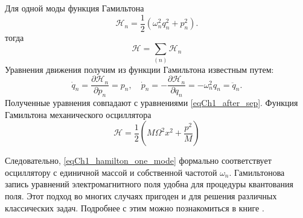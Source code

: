 Для одной моды функция Гамильтона  
\begin{equation}
\mathcal{H}_n = \frac{1}{2}\left(\omega_n^2 q_n^2 + p_n^2\right).
\label{eqCh1_hamilton_one_mode}
\end{equation}
тогда
\begin{equation}
\mathcal{H} = \sum_{(n)} \mathcal{H}_n
\label{eqCh1_hamilton_sum_mode}
\end{equation}
Уравнения движения получим из функции Гамильтона известным путем:
\begin{equation}
\dot{q}_n = \frac{\partial \mathcal{H}_n}{\partial p_n} = p_n,
\quad
\dot{p}_n = - \frac{\partial \mathcal{H}_n}{\partial q_n} =
- \omega_n^2 q_n = \ddot{q}_n.
\end{equation}
Полученные уравнения совпадают с уравнениями \eqref{eqCh1_after_sep}.  
Функция Гамильтона механического осциллятора
\[
\mathcal{H} = \frac{1}{2}\left(M \Omega^2 x^2 + \frac{p^2}{M}\right)
\]

Следовательно, \eqref{eqCh1_hamilton_one_mode} формально соответствует
осциллятору с единичной массой и собственной частотой $\omega_n$.
Гамильтонова запись уравнений 
электромагнитного поля удобна для процедуры квантования поля. Этот
подход во многих случаях пригоден и для решения различных классических
задач. Подробнее с этим можно познакомиться в книге
\cite{bCh1Quantel_Gin}.  
